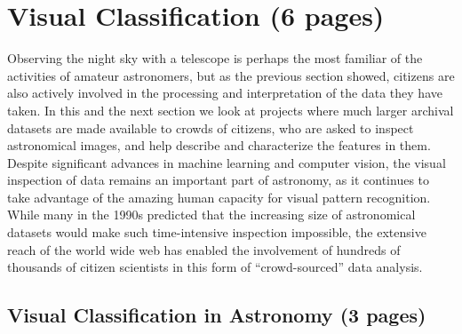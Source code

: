 \documentclass{ar2e}
\begin{document}



\section{Visual Classification (6 pages)}
\label{sec:class}

Observing the night sky with a telescope is perhaps the most familiar of the
activities of amateur astronomers, but as the previous section showed, citizens
are also actively involved in the processing and interpretation of the data they
have taken.  In this and the next section we look at projects where much larger
archival datasets are made available to crowds of citizens, who are asked to
inspect astronomical images, and help describe and characterize the features in
them. Despite significant advances in machine learning and computer vision, the
visual inspection of data remains an important part of astronomy, as it
continues to take advantage of the amazing human capacity for visual pattern
recognition. While many in the 1990s predicted that the increasing size of
astronomical datasets would make such time-intensive inspection impossible, the
extensive reach of the world wide web has enabled the involvement of hundreds of
thousands of citizen scientists in this form of ``crowd-sourced'' data
analysis. 


\subsection{Visual Classification in Astronomy (3 pages)}
\label{sec:class:astro}
\end{document}
